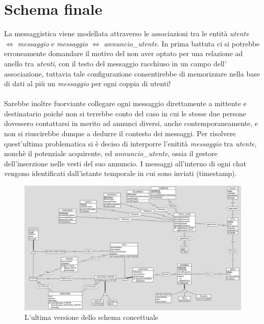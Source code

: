 \documentclass[a4paper,12pt]{report}
\begin{document}
    	\section{Schema finale}
        La messaggistica viene modellata attraverso le associazioni tra le entità \textit{utente $\Leftrightarrow$ messaggio} e 
        \textit{messaggio $\Leftrightarrow$ annuncio\_utente}. In prima battuta ci si potrebbe erroneamente domandare il motivo 
        del non aver optato per una relazione ad anello tra \textit{utenti}, con il testo del messaggio racchiuso in un campo 
        dell’ associazione, tuttavia tale configurazione consentirebbe di memorizzare nella base di dati al più un 
        \textit{messaggio} per ogni coppia di utenti! \\
        \\
        Sarebbe inoltre fuorviante collegare ogni messaggio direttamente 
        a mittente e destinatario poiché non si terrebbe conto del caso in cui le stesse due persone dovessero contattarsi in merito ad annunci 
        diversi, anche contemporaneamente, e non si riuscirebbe dunque a dedurre il contesto dei messaggi. Per risolvere quest’ultima problematica 
        si è deciso di interporre l'enitità \textit{messaggio} tra \textit{utente}, nonchè il potenziale acquirente, ed \textit{annuncio\_utente}, 
        ossia il gestore dell’inserzione nelle vesti del suo annuncio. I messaggi all’interno di ogni chat vengono identificati dall’istante 
        temporale in cui sono inviati (timestamp).



        \begin{figure}[ht]
            \centering{}
            \includegraphics[width=\linewidth]{./images/fourth.png}
            \caption{L'ultima versione dello schema concettuale}
        \end{figure}
\end{document}
